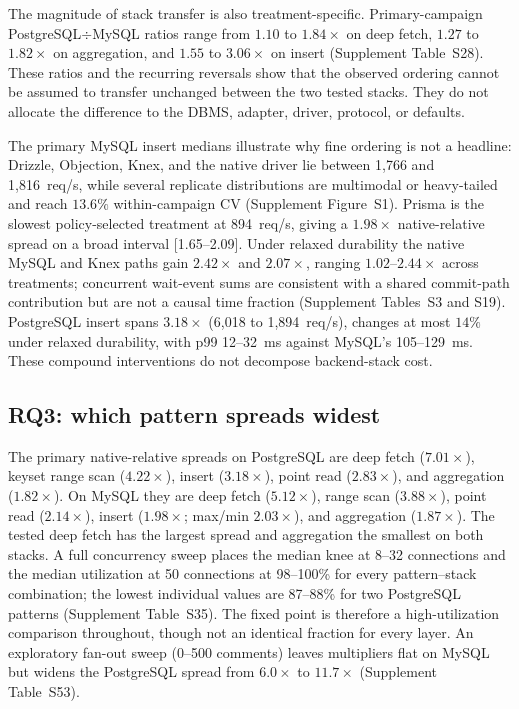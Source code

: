 The magnitude of stack transfer is also treatment-specific. Primary-campaign
PostgreSQL$\div$MySQL ratios range from $1.10$ to $1.84\times$ on deep fetch,
$1.27$ to $1.82\times$ on aggregation, and $1.55$ to $3.06\times$ on insert
(Supplement Table~S28). These ratios and the recurring reversals show that the
observed ordering cannot be assumed to transfer unchanged between the two tested
stacks. They do not allocate the difference to the DBMS, adapter, driver, protocol,
or defaults.

The primary MySQL insert medians illustrate why fine ordering is not a headline: Drizzle,
Objection, Knex, and the native driver lie between 1{,}766 and 1{,}816~req/s, while several replicate
distributions are multimodal or heavy-tailed and reach $13.6\%$ within-campaign CV
(Supplement Figure~S1). Prisma is the slowest policy-selected treatment at 894~req/s, giving a
$1.98\times$ native-relative spread on a broad interval [1.65--2.09]. Under relaxed durability the
native MySQL and Knex paths gain $2.42\times$ and $2.07\times$, ranging $1.02$--$2.44\times$ across
treatments; concurrent wait-event sums are consistent with a shared commit-path contribution but are
not a causal time fraction (Supplement Tables~S3 and S19). PostgreSQL insert spans $3.18\times$
(6{,}018 to 1{,}894~req/s), changes at most $14\%$ under relaxed durability, with p99 12--32~ms
against MySQL's 105--129~ms. These compound interventions do not decompose backend-stack cost.

\subsection{RQ3: which pattern spreads widest}
The primary native-relative spreads on PostgreSQL are deep fetch
($7.01\times$), keyset range scan ($4.22\times$), insert ($3.18\times$), point
read ($2.83\times$), and aggregation ($1.82\times$). On MySQL they are deep fetch
($5.12\times$), range scan ($3.88\times$), point read ($2.14\times$), insert
($1.98\times$; max/min $2.03\times$), and aggregation ($1.87\times$). The tested deep fetch has the
largest spread and aggregation the smallest on both stacks. A full concurrency
sweep places the median knee at 8--32 connections and the median utilization at 50
connections at 98--100\% for every pattern--stack combination; the lowest
individual values are 87--88\% for two PostgreSQL patterns (Supplement Table~S35).
The fixed point is therefore a high-utilization comparison throughout, though not an
identical fraction for every layer. An exploratory fan-out
sweep (0--500 comments) leaves multipliers flat on MySQL but widens the PostgreSQL
spread from $6.0\times$ to $11.7\times$ (Supplement Table~S53).

